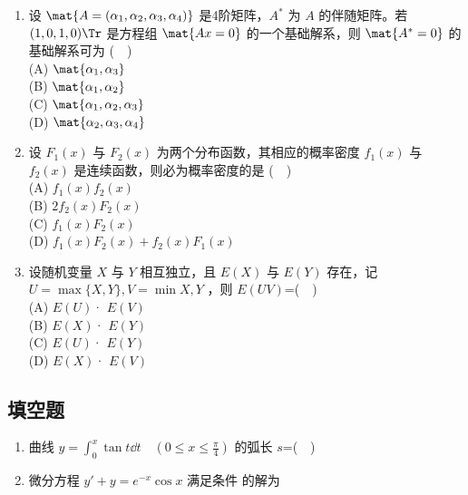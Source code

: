 \begin{enumerate}
(D) $\mat {P_2,P_1^{-1}}$
\item  设 $\mat{A=(\alpha_1,\alpha_2,\alpha_3,\alpha_4)}$ 是4阶矩阵，$A^*$  为 $A$ 的伴随矩阵。若 $(1,0,1,0) \Tr$ 是方程组 $\mat {Ax=0}$ 的一个基础解系，则 $\mat {A^*=0}$ 的基础解系可为 ($\quad$)\\
(A) $\mat {\alpha_1,\alpha_3}$\\
(B) $\mat {\alpha_1,\alpha_2}$\\
(C) $\mat {\alpha_1,\alpha_2,\alpha_3}$\\
(D) $\mat {\alpha_2,\alpha_3,\alpha_4}$
\item  设 $F_1(x)$ 与 $F_2(x)$ 为两个分布函数，其相应的概率密度 $f_1(x)$ 与 $f_2(x)$ 是连续函数，则必为概率密度的是 ($\quad$)\\
(A) $f_1(x)f_2(x)$\\
(B)  $2f_2(x)F_2(x)$\\
(C) $f_1(x)F_2(x)$\\
(D) $f_1(x)F_2(x)+f_2(x)F_1(x)$
\item 设随机变量 $X$ 与 $Y$ 相互独立，且 $E(X)$ 与 $E(Y)$ 存在，记 $U=\max \{X,Y\},V=\min {X,Y}$ ，则 $E(UV)$=($\quad$)\\
(A) $E(U)$· $E(V)$\\
(B)  $E(X)$· $E(Y)$\\
(C) $E(U)$· $E(Y)$\\
(D) $E(X)$· $E(V)$\\
\end{enumerate}
\subsection{填空题}
\begin{enumerate}
\item 曲线 $y=\int_{0}^{x} \tan t\dd{t} \quad (0 \le x \le \frac{\pi}{4})$  的弧长 $s$=($\quad$) 
\item 微分方程 $y'+y=e^{-x}\cos x$ 满足条件   的解为
\end{enumerate}
